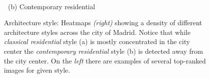 \begin{figure}[t]
\begin{minipage}{\linewidth}
\begin{minipage}{0.7\linewidth}
    \end{minipage}
  \end{minipage}
  \\
  $\;$\hspace{30mm} (b) Contemporary residential
  \\
  \caption{
    Architecture style: Heatmaps \emph{(right)} showing a density of different architecture styles across the city of Madrid. Notice that while \emph{classical residential} style (a) is mostly concentrated in the city center the \emph{contemporary residential} style (b) is detected away from the city center. On the \emph{left} there are examples of several top-ranked images for given style.
  }
  \label{fig:heatArchitecture}
\end{figure}